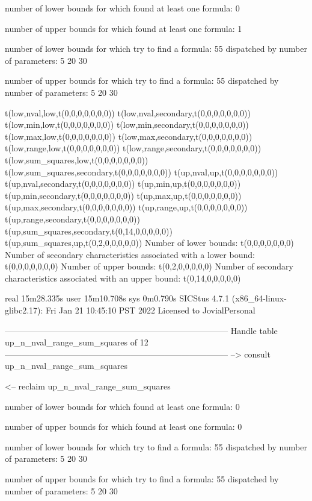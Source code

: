 number of lower bounds for which found at least one formula: 0

number of upper bounds for which found at least one formula: 1

number of lower bounds for which try to find a formula: 55
dispatched by number of parameters: 5  20  30

number of upper bounds for which try to find a formula: 55
dispatched by number of parameters: 5  20  30

t(low,nval,low,t(0,0,0,0,0,0,0))
t(low,nval,secondary,t(0,0,0,0,0,0,0))
t(low,min,low,t(0,0,0,0,0,0,0))
t(low,min,secondary,t(0,0,0,0,0,0,0))
t(low,max,low,t(0,0,0,0,0,0,0))
t(low,max,secondary,t(0,0,0,0,0,0,0))
t(low,range,low,t(0,0,0,0,0,0,0))
t(low,range,secondary,t(0,0,0,0,0,0,0))
t(low,sum_squares,low,t(0,0,0,0,0,0,0))
t(low,sum_squares,secondary,t(0,0,0,0,0,0,0))
t(up,nval,up,t(0,0,0,0,0,0,0))
t(up,nval,secondary,t(0,0,0,0,0,0,0))
t(up,min,up,t(0,0,0,0,0,0,0))
t(up,min,secondary,t(0,0,0,0,0,0,0))
t(up,max,up,t(0,0,0,0,0,0,0))
t(up,max,secondary,t(0,0,0,0,0,0,0))
t(up,range,up,t(0,0,0,0,0,0,0))
t(up,range,secondary,t(0,0,0,0,0,0,0))
t(up,sum_squares,secondary,t(0,14,0,0,0,0,0))
t(up,sum_squares,up,t(0,2,0,0,0,0,0))
Number of lower bounds:                                             t(0,0,0,0,0,0,0)
Number of secondary characteristics associated with a lower bound:  t(0,0,0,0,0,0,0)
Number of upper bounds:                                             t(0,2,0,0,0,0,0)
Number of secondary characteristics associated with an upper bound: t(0,14,0,0,0,0,0)

real	15m28.335s
user	15m10.708s
sys	0m0.790s
SICStus 4.7.1 (x86_64-linux-glibc2.17): Fri Jan 21 10:45:10 PST 2022
Licensed to JovialPersonal


--------------------------------------------------------------------------------
Handle table up_n_nval_range_sum_squares of 12
--------------------------------------------------------------------------------
--> consult up_n_nval_range_sum_squares

<-- reclaim up_n_nval_range_sum_squares

number of lower bounds for which found at least one formula: 0

number of upper bounds for which found at least one formula: 0

number of lower bounds for which try to find a formula: 55
dispatched by number of parameters: 5  20  30

number of upper bounds for which try to find a formula: 55
dispatched by number of parameters: 5  20  30

